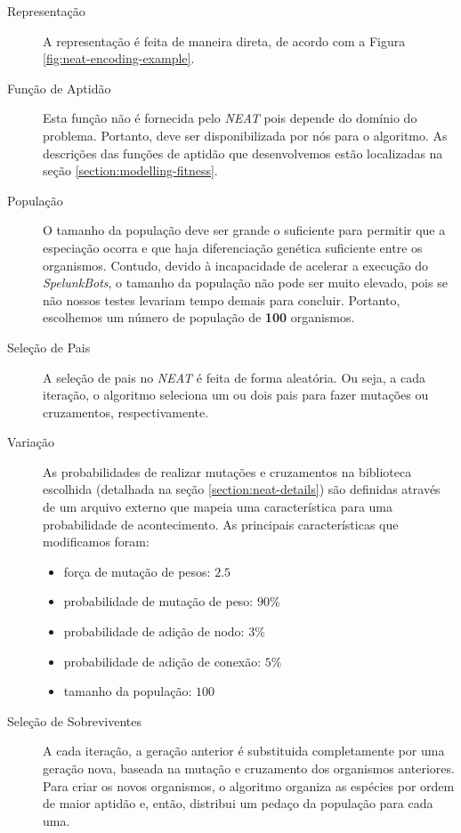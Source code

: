 \begin{description}
	\item[Representação]
		A representação é feita de maneira direta, de acordo com a Figura
		\ref{fig:neat-encoding-example}.

	\item[Função de Aptidão]
		Esta função não é fornecida pelo \textit{NEAT} pois depende do domínio
		do problema. Portanto, deve ser disponibilizada por nós para o
		algoritmo. As descrições das funções de aptidão que desenvolvemos estão
		localizadas na seção \ref{section:modelling-fitness}.

	\item[População]
		O tamanho da população deve ser grande o suficiente para permitir que a
		especiação ocorra e que haja diferenciação genética suficiente entre os
		organismos. Contudo, devido à incapacidade de acelerar a execução do
		\textit{SpelunkBots}, o tamanho da população não pode ser muito elevado,
		pois se não nossos testes levariam tempo demais para concluir. Portanto,
		escolhemos um número de população de \textbf{100} organismos.

	\item[Seleção de Pais] A seleção de pais no \textit{NEAT} é feita de forma
		aleatória. Ou seja, a cada iteração, o algoritmo seleciona um ou dois
		pais para fazer mutações ou cruzamentos, respectivamente.

	\item[Variação] As probabilidades de realizar mutações e cruzamentos na
		biblioteca escolhida (detalhada na seção \ref{section:neat-details}) são
		definidas através de um arquivo externo que mapeia uma característica
		para uma probabilidade de acontecimento. As principais características
		que modificamos foram:
		\begin{itemize}
				\item força de mutação de pesos: $2.5$
				\item probabilidade de mutação de peso: $90\%$
				\item probabilidade de adição de nodo: $3\%$
				\item probabilidade de adição de conexão: $5\%$
				\item tamanho da população: $100$
		\end{itemize}

	\item[Seleção de Sobreviventes]
		A cada iteração, a geração anterior é substituida completamente por uma
		geração nova, baseada na mutação e cruzamento dos organismos anteriores.
		Para criar os novos organismos, o algoritmo organiza as espécies por
		ordem de maior aptidão e, então, distribui um pedaço da população para
		cada uma.

\end{description}

